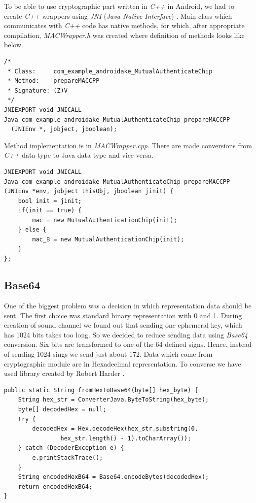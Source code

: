 \documentclass[11pt,titlepage]{article}
\theoremstyle{plain}
\begin{document}
To be able to use cryptographic part written in \textit{C++} in Android, we had to create \textit{C++} wrappers using \textit{JNI} (\textit{Java Native Interface}) \cite{JNI}. Main class which communicates with \textit{C++} code has native methods, for which, after appropriate compilation,  \textit{MACWrapper.h} was created where definition of methods looks like below.

\begin{lstlisting}
/*
 * Class:     com_example_androidake_MutualAuthenticateChip
 * Method:    prepareMACCPP
 * Signature: (Z)V
 */
JNIEXPORT void JNICALL Java_com_example_androidake_MutualAuthenticateChip_prepareMACCPP
  (JNIEnv *, jobject, jboolean);
\end{lstlisting}

Method implementation is in \textit{MACWrapper.cpp}. There are made conversions from \textit{C++} data type to Java data type and vice versa.

\begin{lstlisting}
JNIEXPORT void JNICALL Java_com_example_androidake_MutualAuthenticateChip_prepareMACCPP
(JNIEnv *env, jobject thisObj, jboolean jinit) {
	bool init = jinit;
	if(init == true) {
		mac = new MutualAuthenticationChip(init);
	} else {
		mac_B = new MutualAuthenticationChip(init);
	}
};
\end{lstlisting}

\subsection{Base64}

One of the biggest problem was a decision in which representation data should be sent. The first choice was standard binary representation with 0 and 1. During creation of sound channel we found out that sending one ephemeral key, which has 1024 bits takes too long. So we decided to reduce sending data using \textit{Base64} conversion. Six bits are transformed to one of the 64 defined signs. Hence, instead of sending 1024 sings we send just about 172. Data which come from cryptographic module are in Hexadecimal representation. To converse we have used library created by Robert Harder \cite{base_64}. 

\begin{lstlisting}[caption={Example of code converting from Hex String to Base64 String}]
public static String fromHexToBase64(byte[] hex_byte) {
	String hex_str = ConverterJava.ByteToString(hex_byte);
	byte[] decodedHex = null;
	try {
		decodedHex = Hex.decodeHex(hex_str.substring(0,
				hex_str.length() - 1).toCharArray());
	} catch (DecoderException e) {
		e.printStackTrace();
	}
	String encodedHexB64 = Base64.encodeBytes(decodedHex);
	return encodedHexB64;
}
\end{lstlisting}
\end{document}
